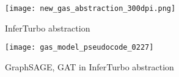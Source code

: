 \documentclass[conference]{IEEEtran}
\begin{document}

\begin{figure}
\centering
\texttt{[image: new\_gas\_abstraction\_300dpi.png]}
\caption{InferTurbo abstraction}
\label{fig:gas_abstraction}
\end{figure}

\begin{figure*}
\centering
\texttt{[image: gas\_model\_pseudocode\_0227]}
\caption{GraphSAGE, GAT in InferTurbo abstraction}
\label{fig:gas_abstraction_example}
\end{figure*}


\end{document}
